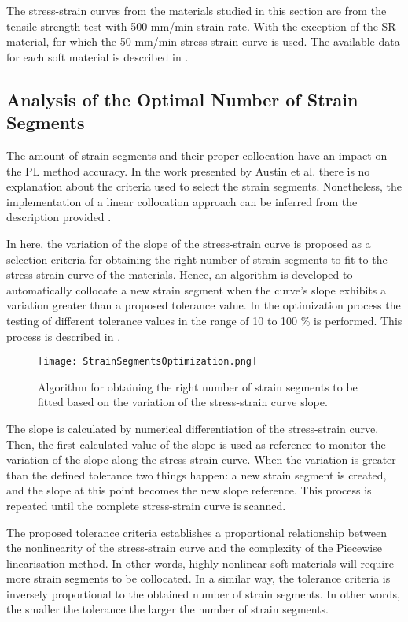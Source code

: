 The stress-strain curves from the materials studied in this section are from the tensile strength test with 500 mm/min strain rate. With the exception of the SR material, for which the 50 mm/min stress-strain curve is used. The available data for each soft material is described in .

\subsection{Analysis of the Optimal Number of Strain Segments} \label{SegmentAnalysis}

The amount of strain segments and their proper collocation have an impact on the PL method accuracy. In the work presented by Austin et al. there is no explanation about the criteria used to select the strain segments. Nonetheless, the implementation of a linear collocation approach can be inferred from the description provided \cite{austin2015control}. 

In here, the variation of the slope of the stress-strain curve is proposed as a selection criteria for obtaining the right number of strain segments to fit to the stress-strain curve of the materials. Hence, an algorithm is developed to automatically collocate a new strain segment when the curve's slope exhibits a variation greater than a proposed tolerance value. In the optimization process the testing of different tolerance values in the range of 10 to 100 \% is performed. This process is described in . 

\begin{figure}[htb!]
	\centering
	\texttt{[image: StrainSegmentsOptimization.png]}
	\caption{ Algorithm for obtaining the right number of strain segments to be fitted based on the variation of the stress-strain curve slope.}
	\label{fig:FCsegments}
\end{figure}

The slope is calculated by numerical differentiation of the stress-strain curve. Then, the first calculated value of the slope is used as reference to monitor the variation of the slope along the stress-strain curve. When the variation is greater than the defined tolerance two things happen: a new strain segment is created, and the slope at this point becomes the new slope reference. This process is repeated until the complete stress-strain curve is scanned.

The proposed tolerance criteria establishes a proportional relationship between the nonlinearity of the stress-strain curve and the complexity of the Piecewise linearisation method. In other words, highly nonlinear soft materials will require more strain segments to be collocated. In a similar way, the tolerance criteria is inversely proportional to the obtained number of strain segments. In other words, the smaller the tolerance the larger the number of strain segments.

